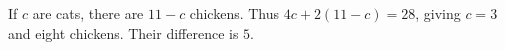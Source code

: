 If $c$ are cats, there are $11-c$ chickens. Thus $4c+2(11-c)=28$, giving $c=3$ and eight chickens. Their difference is $\boxed5$.
